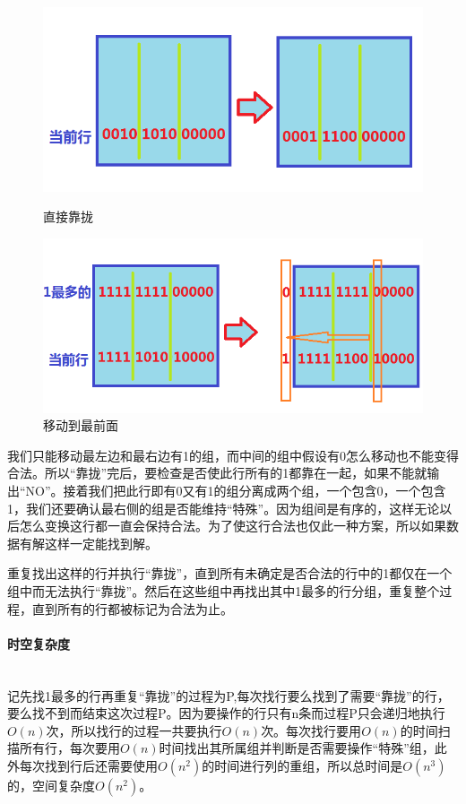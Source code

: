 \documentclass[UTF8]{ctexart}
\newcommand{\myparagraph}[1]{\paragraph{#1}\mbox{}\\}
\theoremstyle{nonumberplain}
\begin{document}
			\begin{figure}[ht]
				\centering
				\begin{minipage}{.45\textwidth}
					\centering
					\includegraphics[width=\textwidth]{_cf243e/fig1.png}
					\caption{直接靠拢}
				\end{minipage}
				\begin{minipage}{.45\textwidth}
					\centering
					\includegraphics[width=\textwidth]{_cf243e/fig2.png}
					\caption{移动到最前面}
				\end{minipage}
			\end{figure}
		
			我们只能移动最左边和最右边有1的组，而中间的组中假设有0怎么移动也不能变得合法。所以“靠拢”完后，要检查是否使此行所有的1都靠在一起，如果不能就输出“NO”。接着我们把此行即有0又有1的组分离成两个组，一个包含0，一个包含1，我们还要确认最右侧的组是否能维持“特殊”。因为组间是有序的，这样无论以后怎么变换这行都一直会保持合法。为了使这行合法也仅此一种方案，所以如果数据有解这样一定能找到解。
		
			重复找出这样的行并执行“靠拢”，直到所有未确定是否合法的行中的1都仅在一个组中而无法执行“靠拢”。然后在这些组中再找出其中1最多的行分组，重复整个过程，直到所有的行都被标记为合法为止。
		
		\myparagraph{时空复杂度}
		
			记先找1最多的行再重复“靠拢”的过程为P,每次找行要么找到了需要“靠拢”的行，要么找不到而结束这次过程P。因为要操作的行只有n条而过程P只会递归地执行$O(n)$次，所以找行的过程一共要执行$O(n)$次。每次找行要用$O(n)$的时间扫描所有行，每次要用$O(n)$时间找出其所属组并判断是否需要操作“特殊”组，此外每次找到行后还需要使用$O(n^2)$的时间进行列的重组，所以总时间是$O(n^3)$的，空间复杂度$O(n^2)$。
	
\end{document}
